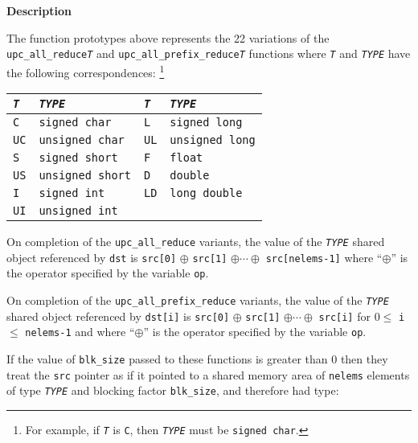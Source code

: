 {\bf Description} 

\np The function prototypes above represents the 22 variations of the
  {\tt upc\_all\_reduce{\em T}} and {\tt upc\_all\_prefix\_reduce{\em T}} 
  functions where {\tt{\em T}} and {\tt{\em TYPE}} have the following 
correspondences: \footnote{For example, if {\tt{\em T}} is {\tt C}, then 
{\tt{\em TYPE}} must be {\tt signed char}.}
\begin{center}
\begin{tabular}{ll|ll}
{\tt{\em T}} & {\tt{\em TYPE}} \hspace*{1.5in} &
{\tt{\em T}} & {\tt{\em TYPE}} \\ \hline
{\tt C} & {\tt signed char} &
{\tt L} & {\tt signed long} \\
{\tt UC} & {\tt unsigned char} &
{\tt UL} & {\tt unsigned long} \\
{\tt S} & {\tt signed short} &
{\tt F} & {\tt float} \\
{\tt US} & {\tt unsigned short} &
{\tt D} & {\tt double} \\
{\tt I} & {\tt signed int} &
{\tt LD} & {\tt long double} \\
{\tt UI} & {\tt unsigned int} &
\end{tabular}
\end{center}

\np On completion of the {\tt upc\_all\_reduce} variants, 
the value of the {\tt{\em TYPE}} shared object
referenced by {\tt dst} is
{\tt src[0]} $\oplus$ {\tt src[1]} $\oplus \cdots \oplus$
{\tt src[nelems-1]}
where ``$\oplus$'' is the operator specified by the variable {\tt op}.

\np On completion of the {\tt upc\_all\_prefix\_reduce} variants, 
the value of the {\tt{\em TYPE}} shared object
referenced by {\tt dst[i]} is
{\tt src[0]} $\oplus$ {\tt src[1]}
$\oplus \cdots \oplus$ {\tt src[i]}
for $0 \leq$ {\tt i} $\leq$ {\tt nelems-1} and
where ``$\oplus$'' is the operator specified by the variable {\tt op}.

\np {}

\np
If the value of {\tt blk\_size} passed to these functions is
greater than 0 then they treat the {\tt src} pointer
as if it pointed to a shared memory area of {\tt nelems} elements of
type {\tt{\em TYPE}} and blocking factor {\tt blk\_size}, and therefore
had type:

